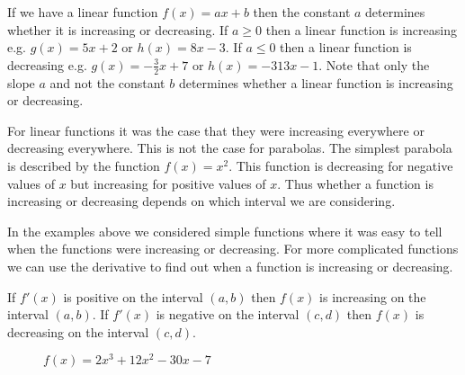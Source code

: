 \documentclass[main.tex]{subfiles}
\begin{document}
\begin{example}
If we have a linear function $f(x) = a x + b$ then the constant $a$ determines whether it is increasing or decreasing. If $a \geq 0$ then a linear function is increasing e.g. $g(x) = 5x + 2$ or $h(x) = 8x - 3$. If $a \leq 0$ then a linear function is decreasing e.g. $g(x) = -\frac{3}{2} x + 7$ or $h(x) = - 313 x - 1$. Note that only the slope $a$ and not the constant $b$ determines whether a linear function is increasing or decreasing.
\end{example}
\begin{example}[A Parabola]
For linear functions it was the case that they were increasing everywhere or decreasing everywhere. This is not the case for parabolas. The simplest parabola is described by the function $f(x) = x^2$. This function is decreasing for negative values of $x$ but increasing for positive values of $x$. Thus whether a function is increasing or decreasing depends on which interval we are considering.
\end{example}
In the examples above we considered simple functions where it was easy to tell when the functions were increasing or decreasing. For more complicated functions we can use the derivative to find out when a function is increasing or decreasing.
\begin{theorem}
If $f'(x)$ is positive on the interval $(a, b)$ then $f(x)$ is increasing on the interval $(a, b)$. If $f'(x)$ is negative on the interval $(c, d)$ then $f(x)$ is decreasing on the interval $(c, d)$.
\end{theorem}

\begin{figure}
\begin{center}
\begin{minipage}[t]{0.45\linewidth}
\caption{$f(x) = \ln x - x^2$}
\end{minipage}
\quad
\begin{minipage}[t]{0.45\linewidth}
\caption{$f(x) = 2 x^3 + 12 x^2 - 30 x - 7$}
\end{minipage}
\end{center}
\end{figure}
\end{document}
